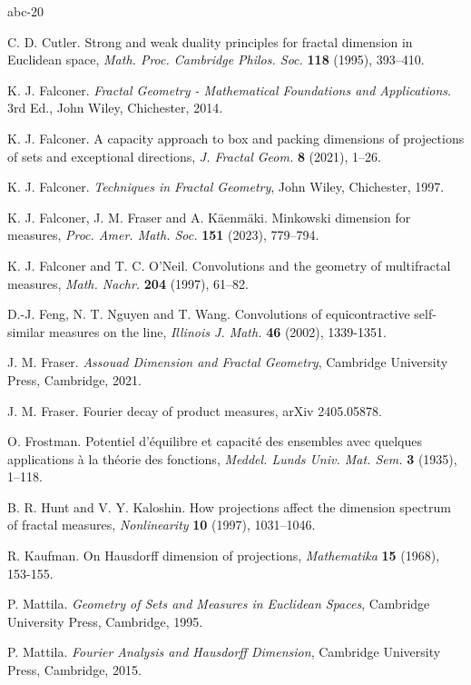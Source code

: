 \documentclass[12pt]{article}
\newcommand{\1}{{\bf 1}}
\begin{document}
\begin{thebibliography}{abc-20}

C. D. Cutler. Strong and weak duality principles for fractal dimension in Euclidean space, {\it Math. Proc. Cambridge Philos. Soc.} {\bf 118} (1995), 393--410.

 K. J. Falconer. {\em Fractal Geometry - Mathematical Foundations and Applications}. 3rd Ed., John Wiley, Chichester, 2014.

K. J. Falconer. A capacity approach to box and packing dimensions of projections of sets and exceptional directions, {\it J. Fractal Geom.} {\bf 8} (2021), 1--26.

 K. J. Falconer. {\em Techniques in Fractal Geometry},  John Wiley, Chichester, 1997.

K. J. Falconer, J. M. Fraser and A. K\"{a}enm\"{a}ki. Minkowski dimension for measures, {\it Proc. Amer. Math. Soc.} {\bf 151} (2023), 779--794.

K. J. Falconer and T. C. O'Neil. Convolutions and the geometry of multifractal measures, 
{\it Math. Nachr.} {\bf 204} (1997), 61--82.

D.-J. Feng, N. T. Nguyen and T. Wang. Convolutions of equicontractive self-similar measures on the line, {\it Illinois J. Math.} {\bf 46} (2002), 1339-1351.

J. M. Fraser. {\em Assouad Dimension and Fractal Geometry}, 
Cambridge University Press, Cambridge, 2021.

J. M. Fraser. Fourier decay of product measures, 
arXiv 2405.05878.

O. Frostman. Potentiel d'\'{e}quilibre et capacit\'{e} des ensembles avec quelques applications \`{a} la th\'{e}orie des fonctions, {\it Meddel. Lunds Univ. Mat. Sem.} {\bf 3} (1935), 1--118.

B. R. Hunt and V. Y. Kaloshin. How projections affect the dimension spectrum of fractal measures, 
{\it Nonlinearity} {\bf 10} (1997), 1031--1046.

R. Kaufman.
On Hausdorff dimension of projections,
 {\em Mathematika} {\bf 15} (1968), 153-155.
 
P. Mattila.
{\em Geometry of Sets and Measures in {E}uclidean Spaces},
Cambridge University Press, Cambridge, 1995.

P. Mattila.
{\em Fourier Analysis and Hausdorff Dimension},
Cambridge University Press, Cambridge, 2015.


\end{thebibliography}
\end{document}
